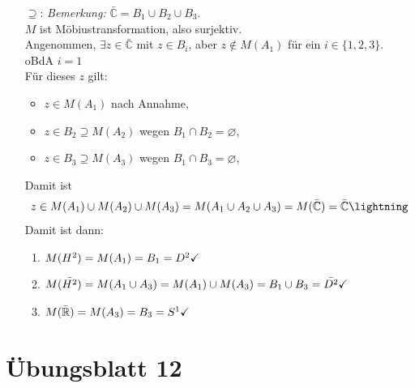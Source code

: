 \begin{solution}
\begin{itemize}
    \item[\( \supseteq \):] \emph{Bemerkung:} \( \bar{\mathbb{C}} = B_1 \cup B_2 \cup B_3 \). \\
    \( M \) ist Möbiustransformation, also surjektiv. \\
    Angenommen, \( \exists z \in \bar{\mathbb{C}} \) mit \( z \in B_i \), aber \( z \notin M(A_1) \) für ein \( i \in \{ 1, 2, 3 \} \). \\
    oBdA \( i = 1 \) \\
    Für dieses \( z \) gilt:
    \begin{itemize}
      \item \( z \in M(A_1) \) nach Annahme,
      \item \( z \in B_2 \supseteq M(A_2) \) wegen \( B_1 \cap B_2 = \varnothing \),
      \item \( z \in B_3 \supseteq M(A_3) \) wegen \( B_1 \cap B_3 = \varnothing \),
    \end{itemize}
    Damit ist
    \begin{equation*}
      z \in M(A_1) \cup M(A_2) \cup M(A_3) = M(A_1 \cup A_2 \cup A_3) = M(\bar{\mathbb{C}}) = \bar{\mathbb{C}} \hfill \lightning
    \end{equation*}
    Damit ist dann:
    \begin{enumerate}[label=(\alph*)] 
      \item \( M(H^2) = M(A_1) = B_1 = D^2 \hfill \checkmark \)
      \item \( M(\bar{H^2}) = M(A_1 \cup A_3) = M(A_1) \cup M(A_3) = B_1 \cup B_3 = \bar{D^2} \hfill \checkmark \)
      \item \( M(\bar{ \mathbb{R}}) = M(A_3) = B_3 = S^1 \hfill \checkmark \) \\
    \end{enumerate}
  \end{itemize}
\end{solution}

%
\section{Übungsblatt 12}
\setcounter{problemcounter}{0}

